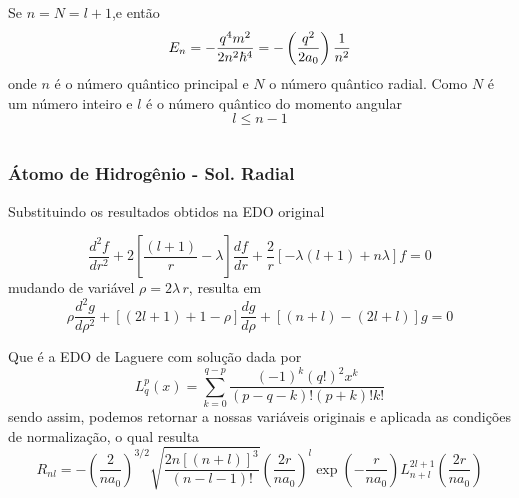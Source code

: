 \documentclass[12pt,brazil,table]{beamer}
\begin{document}
\begin{frame}
\begin{columns}[T]
    Se $n=N=l+1$,e então\vspace*{-0.2cm}
    \[
     E_n = - \dfrac{q^4m^2}{2n^2\hbar^4} = - \left(\dfrac{q^2}{2a_0}\right)\dfrac{1}{n^2}
     \vspace*{-0.2cm}
    \]
    onde $n$ é o número quântico principal e $N$ o número quântico radial.  Como $N$ é um número inteiro e $l$ é o número quântico do momento angular
    \[
     l \leq n-1
    \]
    
    \end{columns}
          
  \end{frame}
  
  



\begin{frame} 
  \frametitle{Átomo de Hidrogênio - Sol. Radial}
  \fontsize{8pt}{11pt}\selectfont
  
    
%     
%     
%     
% 
%     
%     
%     
%     
    
    Substituindo os resultados obtidos na EDO original
    
    \[
     \dfrac{d^2f}{dr^2} + 2\left[ \dfrac{\left(l+1 \right)}{r} - \lambda \right]\dfrac{df}{dr} + \dfrac{2}{r}\left[ -\lambda\left( l+1 \right) + n\lambda\right]f = 0
    \]
    mudando de variável $\rho = 2\lambda\,r$, resulta em
    \[
     \rho \dfrac{d^2g}{d\rho^2} + \left[ \left(2l+1 \right) + 1 - \rho \right]\dfrac{dg}{d\rho} + \left[ \left( n + l \right) - \left( 2l + l \right)  \right]g = 0
    \]
    
    Que é a EDO de Laguere com solução dada por
    \[
     L_q^p(x) = \sum_{k = 0}^{q - p}\dfrac{(-1)^k\left( q! \right)^2x^k}{\left( p - q - k\right)!\left( p+k \right)!k!}
    \]
        sendo assim, podemos retornar a nossas variáveis originais e aplicada as condições de normalização, o qual resulta
    \[
     R_{nl} = -\left(\dfrac{2}{na_0}\right)^{3/2}\sqrt{\dfrac{2n\left[ \left(  n+l\right) \right]^3}{\left( n-l-1 \right)!}}\left( \dfrac{2r}{na_0} \right)^l\exp \left( -\dfrac{r}{na_0} \right)L_{n+l}^{2l+1}\left(\dfrac{2r}{na_0}\right)
    \]
          
  \end{frame}
  
  

\end{document}

